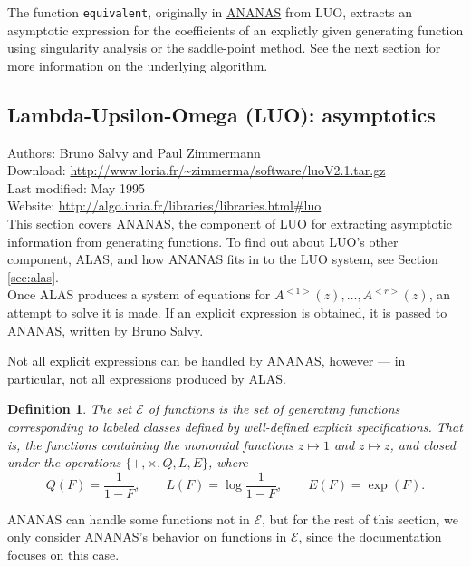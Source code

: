 \documentclass[12pt]{article}
\theoremstyle{plain}
\newtheorem{defin}{Definition}
\newcommand{\codefont}[1]{{\fontshape{n}\texttt{#1}}}
\begin{document}
The function \codefont{equivalent}, originally in \hyperref[sec:ananas]{ANANAS} from LUO, extracts an asymptotic expression for the coefficients of an explictly given generating function using singularity analysis or the saddle-point method.
See the next section for more information on the underlying algorithm.





\subsection{Lambda-Upsilon-Omega (LUO): asymptotics}
\label{sec:ananas}

Authors: Bruno Salvy and Paul Zimmermann
\\
Download: \url{http://www.loria.fr/~zimmerma/software/luoV2.1.tar.gz}
\\
Last modified: May 1995
\\
Website: \url{http://algo.inria.fr/libraries/libraries.html\#luo}
\\

This section covers ANANAS, the component of LUO for extracting asymptotic information from generating functions.
To find out about LUO's other component, ALAS, and how ANANAS fits in to the LUO system, see Section \ref{sec:alas}.
\\

Once ALAS produces a system of equations for \(A^{<1>}(z), \dots, A^{<r>}(z) \), an attempt to solve it is made.  If an explicit expression is obtained, it is passed to ANANAS, written by
Bruno Salvy.

Not all explicit expressions can be handled by ANANAS, however --- in particular, not all expressions produced by ALAS.

\begin{defin}
The set \( \mathscr{E} \) of functions is the set of generating functions corresponding to labeled classes defined by well-defined explicit specifications.  That is, the functions containing the monomial functions \(z \mapsto 1\) and \( z \mapsto z \), and closed under the operations \( \{+,\times, Q,L,E \} \), where
\[ Q(F) = \frac{1}{1-F}, \qquad L(F) = \log\frac{1}{1-F}, \qquad E(F) = \exp(F). \]
\end{defin}
ANANAS can handle some functions not in \( \mathscr{E} \),
but for the rest of this section, we only consider ANANAS's behavior on functions in \( \mathscr{E} \),
since the documentation focuses on this case.
\end{document}
